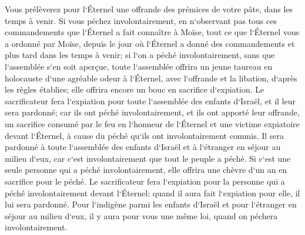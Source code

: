 \verse Vous prélèverez pour l`Éternel une offrande des prémices de votre pâte, dans les temps à venir. 
\verse Si vous péchez involontairement, en n`observant pas tous ces commandements que l`Éternel a fait connaître à Moïse, 
\verse tout ce que l`Éternel vous a ordonné par Moïse, depuis le jour où l`Éternel a donné des commandements et plus tard dans les temps à venir; 
\verse si l`on a péché involontairement, sans que l`assemblée s`en soit aperçue, toute l`assemblée offrira un jeune taureau en holocauste d`une agréable odeur à l`Éternel, avec l`offrande et la libation, d`après les règles établies; elle offrira encore un bouc en sacrifice d`expiation. 
\verse Le sacrificateur fera l`expiation pour toute l`assemblée des enfants d`Israël, et il leur sera pardonné; car ils ont péché involontairement, et ils ont apporté leur offrande, un sacrifice consumé par le feu en l`honneur de l`Éternel et une victime expiatoire devant l`Éternel, à cause du péché qu`ils ont involontairement commis. 
\verse Il sera pardonné à toute l`assemblée des enfants d`Israël et à l`étranger en séjour au milieu d`eux, car c`est involontairement que tout le peuple a péché. 
\verse Si c`est une seule personne qui a péché involontairement, elle offrira une chèvre d`un an en sacrifice pour le péché. 
\verse Le sacrificateur fera l`expiation pour la personne qui a péché involontairement devant l`Éternel: quand il aura fait l`expiation pour elle, il lui sera pardonné. 
\verse Pour l`indigène parmi les enfants d`Israël et pour l`étranger en séjour au milieu d`eux, il y aura pour vous une même loi, quand on péchera involontairement. 
